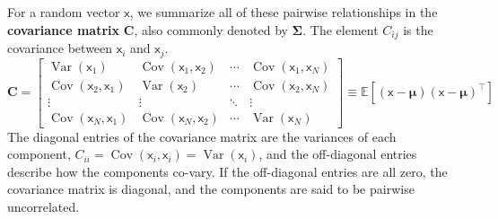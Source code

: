 For a random vector $\boldsymbol{\mathsf{x}}$, we summarize all of these pairwise relationships in the \textbf{covariance matrix} $\mathbf{C}$, also commonly denoted by $\boldsymbol \Sigma$. The element $C_{ij}$ is the covariance between $\mathsf{x}_i$ and $\mathsf{x}_j$.
\begin{equation}
    \mathbf{C} = \begin{bmatrix}
        \operatorname{Var}(\mathsf{x}_1) & \operatorname{Cov}(\mathsf{x}_1, \mathsf{x}_2) & \cdots & \operatorname{Cov}(\mathsf{x}_1, \mathsf{x}_N) \\
        \operatorname{Cov}(\mathsf{x}_2, \mathsf{x}_1) & \operatorname{Var}(\mathsf{x}_2) & \cdots & \operatorname{Cov}(\mathsf{x}_2, \mathsf{x}_N) \\
        \vdots & \vdots & \ddots & \vdots \\
        \operatorname{Cov}(\mathsf{x}_N, \mathsf{x}_1) & \operatorname{Cov}(\mathsf{x}_N, \mathsf{x}_2) & \cdots & \operatorname{Var}(\mathsf{x}_N)  
    \end{bmatrix} \equiv \mathbb{E}[ (\boldsymbol{\mathsf{x}} - \boldsymbol \mu) (\boldsymbol{\mathsf{x}} - \boldsymbol \mu)^\top ]
\end{equation}
The diagonal entries of the covariance matrix are the variances of each component, $C_{ii} = \operatorname{Cov}(\mathsf{x}_i, \mathsf{x}_i) = \operatorname{Var}(\mathsf{x}_i)$, and the off-diagonal entries describe how the components co-vary. If the off-diagonal entries are all zero, the covariance matrix is diagonal, and the components are said to be pairwise uncorrelated. 

